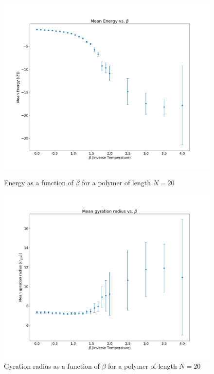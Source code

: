 \begin{figure}[h!]
    \vspace{0.5cm} %
    
    \begin{minipage}[b]{0.45\textwidth}
        \centering
        \includegraphics[width=\textwidth]{FIG/exercise_6_images/energy_mmc.png}
        \caption{Energy as a function of $\beta$ for a polymer of length $N = 20$}
        \label{energy_mmc}
    \end{minipage}
    \hspace{0.05\textwidth} %
    \begin{minipage}[b]{0.45\textwidth}
        \centering
        \includegraphics[width=\textwidth]{FIG/exercise_6_images/gyr_rad_mmc.png}
        \caption{Gyration radius as a function of $\beta$ for a polymer of length $N = 20$}
        \label{gyr_rad_mmc}
    \end{minipage}
    

\end{figure}
